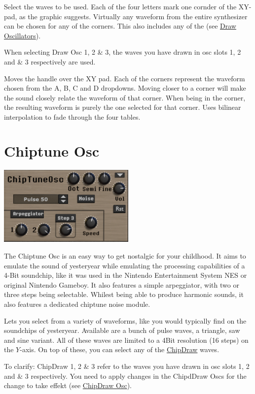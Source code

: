 {Select the waves to be used. Each of the four letters mark one cornder of the XY-pad, as the graphic suggests. Virtually any waveform from the entire synthesizer can be chosen for any of the corners. This also includes any of the (see \hyperref[wavedraw]{Draw Oscillators}).

When selecting  Draw Osc 1, 2 \& 3, the waves you have drawn in osc slots 1, 2 and \& 3 respectively are used.}

{Moves the handle over the XY pad. Each of the corners represent the waveform chosen from the A, B, C and D dropdowns. Moving closer to a corner will make the sound closely relate the waveform of that corner. When being in the corner, the resulting waveform is purely the one selected for that corner. Uses bilinear interpolation to fade through the four tables.}

\section{Chiptune Osc}
\begin{center}
    \includegraphics[width=0.5\textwidth]{graphics/chiptune_osc.png}
\end{center}
The Chiptune Osc is an easy way to get nostalgic for your childhood. It aims to emulate the sound of yesteryear while emulating the processing capabilities of a 4-Bit soundchip, like it was used in the Nintendo Entertainment System NES or original Nintendo Gameboy. It also features a simple arpeggiator, with two or three steps being selectable. Whilest being able to produce harmonic sounds, it also features a dedicated chiptune noise module.

{Lets you select from a variety of waveforms, like you would typically find on the soundchips of yesteryear. Available are a bunch of pulse waves, a triangle, saw and sine variant. All of these waves are limited to a 4Bit resolution (16 steps) on the $Y$-axis. On top of these, you can select any of the \hyperref[chipdraw]{ChipDraw} waves.

To clarify: ChipDraw 1, 2 \& 3 refer to the waves you have drawn in osc slots 1, 2 and \& 3 respectively. You need to apply changes in the ChipdDraw Oscs for the change to take effekt (see \hyperref[chipdraw]{ChipDraw Osc}).}

